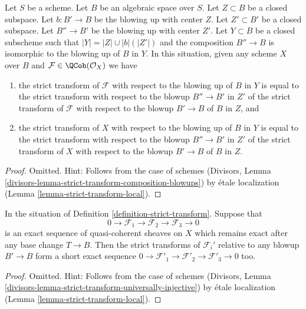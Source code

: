 \begin{lemma}
\label{lemma-strict-transform-composition-blowups}
Let $S$ be a scheme. Let $B$ be an algebraic space over $S$.
Let $Z \subset B$ be a closed subspace.
Let $b : B' \to B$ be the blowing up with center $Z$.
Let $Z' \subset B'$ be a closed subspace.
Let $B'' \to B'$ be the blowing up with center $Z'$.
Let $Y \subset B$ be a closed subscheme such that
$|Y| = |Z| \cup |b|(|Z'|)$ and the composition $B'' \to B$
is isomorphic to the blowing up of $B$ in $Y$.
In this situation, given any scheme $X$ over $B$ and
$\mathcal{F} \in \QCoh(\mathcal{O}_X)$ we have
\begin{enumerate}
\item the strict transform of $\mathcal{F}$ with respect to the blowing
up of $B$ in $Y$ is equal to the strict transform with respect to the
blowup $B'' \to B'$ in $Z'$ of the strict transform of $\mathcal{F}$
with respect to the blowup $B' \to B$ of $B$ in $Z$, and
\item the strict transform of $X$ with respect to the blowing
up of $B$ in $Y$ is equal to the strict transform with respect to the
blowup $B'' \to B'$ in $Z'$ of the strict transform of $X$
with respect to the blowup $B' \to B$ of $B$ in $Z$.
\end{enumerate}
\end{lemma}

\begin{proof}
Omitted. Hint: Follows from the case of schemes
(Divisors, Lemma \ref{divisors-lemma-strict-transform-composition-blowups})
by \'etale localization (Lemma \ref{lemma-strict-transform-local}).
\end{proof}

\begin{lemma}
\label{lemma-strict-transform-universally-injective}
In the situation of Definition \ref{definition-strict-transform}.
Suppose that
$$
0 \to \mathcal{F}_1 \to \mathcal{F}_2 \to \mathcal{F}_3 \to 0
$$
is an exact sequence of quasi-coherent sheaves on $X$ which remains
exact after any base change $T \to B$. Then the strict transforms of
$\mathcal{F}_i'$ relative to any blowup $B' \to B$
form a short exact sequence
$0 \to \mathcal{F}'_1 \to \mathcal{F}'_2 \to \mathcal{F}'_3 \to 0$ too.
\end{lemma}

\begin{proof}
Omitted. Hint: Follows from the case of schemes
(Divisors, Lemma \ref{divisors-lemma-strict-transform-universally-injective})
by \'etale localization (Lemma \ref{lemma-strict-transform-local}).
\end{proof}

